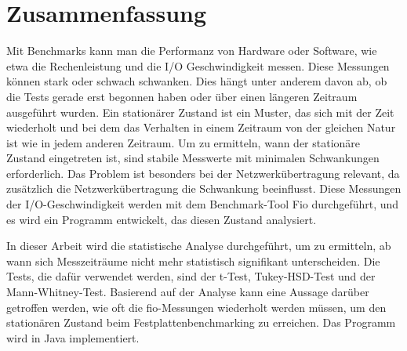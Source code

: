 \section*{Zusammenfassung}
\label{sec:Zusammenfassung}

Mit Benchmarks kann man die Performanz von Hardware oder Software, wie etwa die Rechenleistung und die I/O Geschwindigkeit messen. 
Diese Messungen können stark oder schwach schwanken. Dies hängt unter anderem davon ab, ob die Tests gerade erst begonnen haben oder über einen längeren Zeitraum ausgeführt wurden.
Ein stationärer Zustand ist ein Muster, das sich mit der Zeit wiederholt und bei dem das Verhalten in einem Zeitraum von der gleichen Natur ist wie in jedem anderen Zeitraum.
Um zu ermitteln, wann der stationäre Zustand eingetreten ist, sind stabile Messwerte mit minimalen Schwankungen erforderlich.
Das Problem ist besonders bei der Netzwerkübertragung relevant, da zusätzlich die Netzwerkübertragung die Schwankung beeinflusst.
Diese Messungen der I/O-Geschwindigkeit werden mit dem Benchmark-Tool Fio durchgeführt, und es wird ein Programm entwickelt, das diesen Zustand analysiert. 

In dieser Arbeit wird die statistische Analyse durchgeführt, um zu ermitteln, ab wann sich Messzeiträume nicht mehr statistisch signifikant unterscheiden. Die Tests, die dafür verwendet werden, sind der t-Test, Tukey-HSD-Test und der Mann-Whitney-Test. 
Basierend auf der Analyse kann eine Aussage darüber getroffen werden, wie oft die fio-Messungen wiederholt werden müssen, um den stationären Zustand beim Festplattenbenchmarking zu erreichen.
Das Programm wird in Java implementiert.